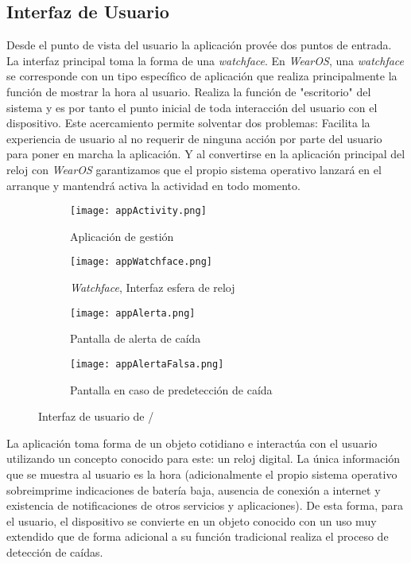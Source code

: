 \subsection{Interfaz de Usuario}
Desde el punto de vista del usuario la aplicación provée dos puntos de entrada. La interfaz principal toma la forma de una \textit{watchface}. En \textit{WearOS}, una \textit{watchface} se corresponde con un tipo específico de aplicación que realiza principalmente la función de mostrar la hora al usuario. Realiza la función de "escritorio" del sistema y es por tanto el punto inicial de toda interacción del usuario con el dispositivo. Este acercamiento permite solventar dos problemas: Facilita la experiencia de usuario al no requerir de ninguna acción por parte del usuario para poner en marcha la aplicación. Y al convertirse en la aplicación principal del reloj con  \textit{WearOS} garantizamos que el propio sistema operativo lanzará en el arranque y mantendrá activa la actividad en todo momento.

\begin{figure}[!ht]
  \centering
  \begin{subfigure}[t]{0.23\textwidth}
      \centering
      \texttt{[image: appActivity.png]}
      \caption{\footnotesize Aplicación de gestión}
      \label{fig:uiActivity}
  \end{subfigure}
  \hfill
  \begin{subfigure}[t]{0.23\textwidth}
      \centering
      \texttt{[image: appWatchface.png]}
      \caption{\footnotesize \textit{Watchface}, Interfaz esfera de reloj}
      \label{fig:uiWatchface}
  \end{subfigure}
  \hfill
  \begin{subfigure}[t]{0.23\textwidth}
      \centering
      \texttt{[image: appAlerta.png]}
      \caption{\footnotesize Pantalla de alerta de caída}
      \label{fig:uiAlerta}
  \end{subfigure}
  \hfill
  \begin{subfigure}[t]{0.23\textwidth}
      \centering
      \texttt{[image: appAlertaFalsa.png]}
      \caption{\footnotesize Pantalla en caso de predetección de caída}
      \label{fig:uiAlertaFalsa}
  \end{subfigure}
  \caption{\footnotesize \label{fig:ifell:UI} Interfaz de usuario de \ifell/}
\end{figure}


La aplicación toma forma de un objeto cotidiano e interactúa con el usuario utilizando un concepto conocido para este: un reloj digital. La única información que se muestra al usuario es la hora (adicionalmente el propio sistema operativo sobreimprime indicaciones de batería baja, ausencia de conexión a internet y existencia de notificaciones de otros servicios y aplicaciones). De esta forma, para el usuario, el dispositivo se convierte en un objeto conocido con un uso muy extendido que de forma adicional a su función tradicional realiza el proceso de detección de caídas.

